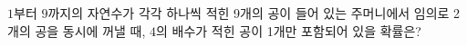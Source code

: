 $1$부터 $9$까지의 자연수가 각각 하나씩 적힌 9개의 공이 들어 있는 주머니에서 임의로 2개의 공을 동시에 꺼낼 때, $4$의 배수가 적힌 공이 1개만 포함되어 있을 확률은?
